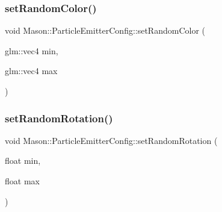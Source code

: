 \hypertarget{struct_mason_1_1_particle_emitter_config_a5317af2f90691360678a2663a747c36d}{}\label{struct_mason_1_1_particle_emitter_config_a5317af2f90691360678a2663a747c36d} 
\subsubsection{\texorpdfstring{set\+Random\+Color()}{setRandomColor()}}
{\footnotesize\ttfamily void Mason\+::\+Particle\+Emitter\+Config\+::set\+Random\+Color (\begin{DoxyParamCaption}\item[{glm\+::vec4}]{min,  }\item[{glm\+::vec4}]{max }\end{DoxyParamCaption})\hspace{0.3cm}{\ttfamily [inline]}}

\hypertarget{struct_mason_1_1_particle_emitter_config_a463adb67fe4ee1732daa20e9d01d2331}{}\label{struct_mason_1_1_particle_emitter_config_a463adb67fe4ee1732daa20e9d01d2331} 
\subsubsection{\texorpdfstring{set\+Random\+Rotation()}{setRandomRotation()}}
{\footnotesize\ttfamily void Mason\+::\+Particle\+Emitter\+Config\+::set\+Random\+Rotation (\begin{DoxyParamCaption}\item[{float}]{min,  }\item[{float}]{max }\end{DoxyParamCaption})\hspace{0.3cm}{\ttfamily [inline]}}

\hypertarget{struct_mason_1_1_particle_emitter_config_ab644fd902c0e29f758a53912d0784f19}{}\label{struct_mason_1_1_particle_emitter_config_ab644fd902c0e29f758a53912d0784f19} 
